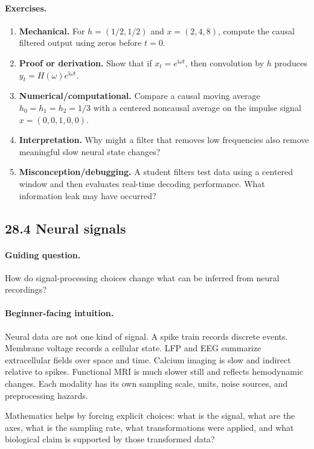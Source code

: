 \paragraph{Exercises.}
\begin{enumerate}[label=\textbf{28.3.\arabic*.}, leftmargin=*]
\item \textbf{Mechanical.} For \(h=(1/2,1/2)\) and \(x=(2,4,8)\), compute the causal filtered output using zeros before \(t=0\).
\item \textbf{Proof or derivation.} Show that if \(x_t=e^{\mathrm{i}\omega t}\), then convolution by \(h\) produces \(y_t=H(\omega)e^{\mathrm{i}\omega t}\).
\item \textbf{Numerical/computational.} Compare a causal moving average \(h_0=h_1=h_2=1/3\) with a centered noncausal average on the impulse signal \(x=(0,0,1,0,0)\).
\item \textbf{Interpretation.} Why might a filter that removes low frequencies also remove meaningful slow neural state changes?
\item \textbf{Misconception/debugging.} A student filters test data using a centered window and then evaluates real-time decoding performance. What information leak may have occurred?
\end{enumerate}

\subsection{28.4 Neural signals}

\paragraph{Guiding question.}
How do signal-processing choices change what can be inferred from neural recordings?

\paragraph{Beginner-facing intuition.}
Neural data are not one kind of signal. A spike train records discrete events. Membrane voltage records a cellular state. LFP and EEG summarize extracellular fields over space and time. Calcium imaging is slow and indirect relative to spikes. Functional MRI is much slower still and reflects hemodynamic changes. Each modality has its own sampling scale, units, noise sources, and preprocessing hazards.

Mathematics helps by forcing explicit choices: what is the signal, what are the axes, what is the sampling rate, what transformations were applied, and what biological claim is supported by those transformed data?

